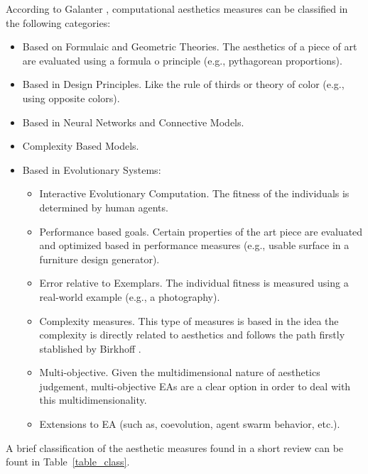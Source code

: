 \documentclass[conference]{IEEEtran}
\begin{document}
According to Galanter \cite{galanter2012computational}, computational aesthetics measures can be classified in the following categories:
\begin{itemize}
	\item Based on Formulaic and Geometric Theories. The aesthetics of a piece of art are evaluated using a formula o principle (e.g., pythagorean proportions).
	\item Based in Design Principles. Like the rule of thirds or theory of color (e.g., using opposite colors).
	\item Based in Neural Networks and Connective Models. 
	\item Complexity Based Models. 
	\item Based in Evolutionary Systems:
		\begin{itemize}
			\item Interactive Evolutionary Computation. The fitness of the individuals is determined by human agents.
			\item Performance based goals. Certain properties of the art piece are evaluated and optimized based in performance measures (e.g., usable surface in a furniture design generator).  
			\item Error relative to Exemplars. The individual fitness is measured using a real-world example (e.g., a photography).
			\item Complexity measures. This type of measures is based in the idea the complexity is directly related to aesthetics and follows the path firstly stablished by Birkhoff \cite{birkhoff2003aesthetic}.
			\item Multi-objective. Given the multidimensional nature of aesthetics judgement, multi-objective EAs are a clear option in order to deal with this multidimensionality.
			\item Extensions to EA (such as, coevolution, agent swarm behavior, etc.).
		\end{itemize}
\end{itemize}

A brief classification of the aesthetic measures found in a short review can be fount in Table~\ref{table_class}.
\end{document}
